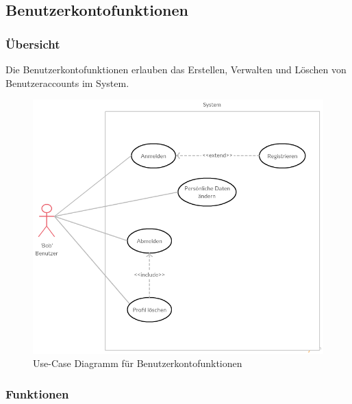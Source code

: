 \documentclass[parskip=full]{scrartcl}
\begin{document}
\subsection{Benutzerkontofunktionen}

\subsubsection{Übersicht}
Die Benutzerkontofunktionen erlauben das Erstellen, Verwalten und Löschen von Benutzeraccounts im System.

\begin{figure}[H]
	\centering
	\includegraphics[width=.7\textwidth]{Use_Cases/use_case_Benutzerprofil.png}
	\caption{Use-Case Diagramm für Benutzerkontofunktionen}	
\end{figure}

\subsubsection{Funktionen}
\end{document}
